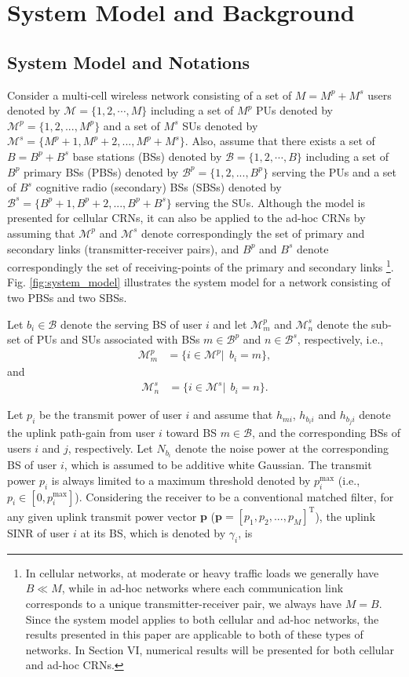 \documentclass[journal,twoside]{IEEEtran}
\newcommand{\B}{\mathcal{B}}
\newcommand{\M}{\mathcal{M}}
\newcommand{\pbold}{\mathbf{p}}
\newcommand{\hup}[2]{h_{#1 #2}}
\newcommand{\Nup}[1]{N_{#1}}
\newcommand{\pup}{p}
\newcommand{\pmax}{p^{\mathrm{max}}}
\begin{document}
\section{System Model and Background}
	\label{sec:system_model}
	\subsection{System Model and Notations}
	Consider a multi-cell wireless network consisting of a set of $M=M^{p}+M^s$ users denoted by $\M=\{1,2,\cdots ,M\}$ including a set of $M^{p}$ PUs denoted by $\M^{p}=\{1,2,...,M^{p}\}$ and a set of $M^s$ SUs denoted by $\M^s=\{M^{p}+1,M^{p}+2,...,M^{p}+M^s\}$. Also, assume that there exists a set of $B=B^{p}+B^s$ base stations (BSs) denoted by $\B=\{1,2,\cdots,B\}$ including a set of $B^{p}$ primary BSs (PBSs) denoted by $\B^{p}=\{1,2,...,B^{p}\}$ serving the PUs and a set of $B^s$ cognitive radio (secondary) BSs (SBSs) denoted by $\B^s=\{B^{p}+1,B^{p}+2,...,B^{p}+B^s\}$ serving the SUs. Although the model is presented for cellular CRNs, it can also be applied to the ad-hoc CRNs by assuming that $\M^{p}$ and $\M^{s}$ denote correspondingly the set of primary and secondary links (transmitter-receiver pairs), and $B^p$ and $B^s$ denote correspondingly the set of receiving-points of the primary and secondary links \footnote{In cellular networks, at moderate or heavy traffic loads we generally have \mbox{$B \ll M$}, while in ad-hoc networks where each communication link corresponds to a unique transmitter-receiver pair, we always have $M=B$. Since the system model applies to both cellular and ad-hoc networks, the results presented  in this paper are applicable to both of these types of networks. In Section VI, numerical results  will be presented for both cellular and ad-hoc CRNs.}.
	 Fig. \ref{fig:system_model} illustrates the system model for a network consisting of two PBSs and two SBSs.
	
	Let $b_i\in\B$ denote the serving BS of user $i$ and let $\M^{p}_m$ and $\M^s_n$ denote the sub-set of PUs and SUs associated with BSs $m\in\B^{p}$ and $n\in\B^s$, respectively, i.e.,
	\begin{align*}
		\M^{p}_m &= \{i\in\M^{p} |\ \ b_i=m \}, 
	\end{align*}
	and
	\begin{align*}
		\M^s_n &= \{i\in\M^s |\ \ b_i=n \}.
	\end{align*}
	
	Let $\pup_i$ be the transmit power of user $i$ and assume that $\hup{m}{i}$, $\hup{b_i}{i}$ and $\hup{b_j}{i}$ denote the uplink path-gain from user $i$ toward BS $m\in\B$, and the corresponding BSs of users $i$ and  $j$, respectively. Let $\Nup{b_i}$ denote the noise power at the corresponding BS of user $i$, which is assumed to be additive white Gaussian. The transmit power $p_i$ is always limited to a maximum threshold denoted by $\pmax_i$ (i.e., \mbox{$p_i\in[0, \pmax_i]$}). Considering the receiver to be a conventional matched filter, for any given uplink transmit power vector $\mathbf{p}$ ($\pbold =\![p_1,p_2,...,p_M]^\mathrm{T}$), the uplink SINR of user $i$ at its BS, which is denoted by $\gamma_i$, is
	
\end{document}
